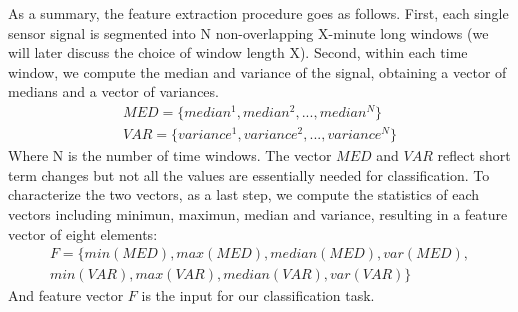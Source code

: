 As a summary, the feature extraction procedure goes as follows. First, each single sensor signal is segmented into N non-overlapping X-minute long windows (we will later discuss the choice of window length X). Second, within each time window, we compute the median and variance of the signal, obtaining a vector of medians and a vector of variances. 
\begin{displaymath}
\begin{split}
MED = \{median^{1}, median^{2}, ..., median^{N}\}\\
VAR = \{variance^{1}, variance^{2}, ..., variance^{N}\}
\end{split}
\end{displaymath}
Where N is the number of time windows. The vector $MED$ and $VAR$ reflect short term changes but not all the values are essentially needed for classification. To characterize the two vectors, as a last step, we compute the statistics of each vectors including minimun, maximun, median and variance, resulting in a feature vector of eight elements:
\begin{displaymath}
\begin{split}
F = \{min(MED), max(MED), median(MED), var(MED),\\
 min(VAR), max(VAR), median(VAR), var(VAR)\}
\end{split}
\end{displaymath}
And feature vector $F$ is the input for our classification task.

